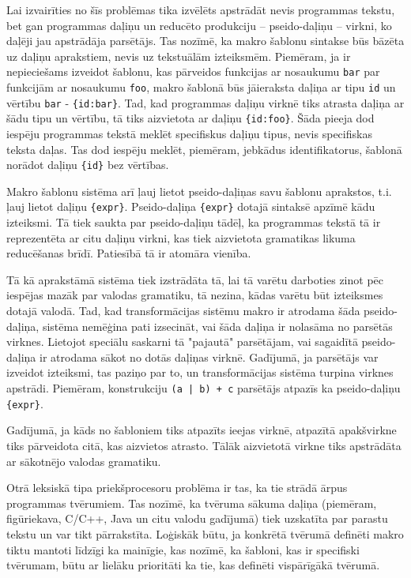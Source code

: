 Lai izvairīties no šīs problēmas tika izvēlēts apstrādāt nevis programmas tekstu, bet gan programmas daļiņu un reducēto produkciju -- pseido-daļiņu -- virkni, ko daļēji jau apstrādāja parsētājs. Tas nozīmē, ka makro šablonu sintakse būs bāzēta uz daļiņu aprakstiem, nevis uz tekstuālām izteiksmēm. Piemēram, ja ir nepieciešams izveidot šablonu, kas pārveidos funkcijas ar nosaukumu \verb|bar| par funkcijām ar nosaukumu \verb|foo|, makro šablonā būs jāieraksta daļiņa ar tipu \verb|id| un vērtību \verb|bar| - \verb|{id:bar}|. Tad, kad programmas daļiņu virknē tiks atrasta daļiņa ar šādu tipu un vērtību, tā tiks aizvietota ar daļiņu \verb|{id:foo}|. Šāda pieeja dod iespēju programmas tekstā meklēt specifiskus daļiņu tipus, nevis specifiskas teksta daļas. Tas dod iespēju meklēt, piemēram, jebkādus identifikatorus, šablonā norādot daļiņu \verb|{id}| bez vērtības. 

Makro šablonu sistēma arī ļauj lietot pseido-daļiņas savu šablonu aprakstos, t.i. ļauj lietot daļiņu \verb|{expr}|. Pseido-daļiņa \verb|{expr}| dotajā sintaksē apzīmē kādu izteiksmi. Tā tiek saukta par pseido-daļiņu tādēļ, ka programmas tekstā tā ir reprezentēta ar citu daļiņu virkni, kas tiek aizvietota gramatikas likuma reducēšanas brīdī. Patiesībā tā ir atomāra vienība.

Tā kā aprakstāmā sistēma tiek izstrādāta tā, lai tā varētu darboties zinot pēc iespējas mazāk par valodas gramatiku, tā nezina, kādas varētu būt izteiksmes dotajā valodā. Tad, kad transformācijas sistēmu makro ir atrodama šāda pseido-daļiņa, sistēma nemēģina pati izsecināt, vai šāda daļiņa ir nolasāma no parsētās virknes. Lietojot speciālu saskarni tā "pajautā" parsētājam, vai sagaidītā pseido-daļiņa ir atrodama sākot no dotās daļiņas virknē. Gadījumā, ja parsētājs var izveidot izteiksmi, tas paziņo par to, un transformācijas sistēma turpina virknes apstrādi. Piemēram, konstrukciju \verb/(a | b) + c/ parsētājs atpazīs ka pseido-daļiņu \verb|{expr}|.

Gadījumā, ja kāds no šabloniem tiks atpazīts ieejas virknē, atpazītā apakšvirkne tiks pārveidota citā, kas aizvietos atrasto. Tālāk aizvietotā virkne tiks apstrādāta ar sākotnējo valodas gramatiku.

Otrā leksiskā tipa priekšprocesoru problēma ir tas, ka tie strādā ārpus programmas tvērumiem. Tas nozīmē, ka tvēruma sākuma daļiņa (piemēram, figūriekava, C/C++, Java un citu valodu gadījumā) tiek uzskatīta par parastu tekstu un var tikt pārrakstīta. Loģiskāk būtu, ja konkrētā tvērumā definēti makro tiktu mantoti līdzīgi ka mainīgie, kas nozīmē, ka šabloni, kas ir specifiski tvērumam, būtu ar lielāku prioritāti ka tie, kas definēti vispārīgākā tvērumā. 

